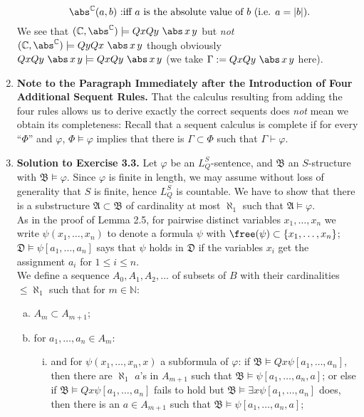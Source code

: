 \begin{enumerate}[1.]
\[
\mbox{ $\abs^\mathbb{C} (a, b)$ :iff $a$ is the absolute value of $b$ (i.e. $a = |b|$)}.
\]
We see that $(\mathbb{C}, \abs^\mathbb{C}) \models QxQy \ \abs \, x \, y$ but \emph{not} $(\mathbb{C}, \abs^\mathbb{C}) \models QyQx \ \abs \, x \, y$ though obviously $QxQy \ \abs \, x \, y \models QxQy \ \abs \, x \, y$ (we take $\Gamma := QxQy \ \abs \, x \, y$ here).
%
\item \textbf{Note to the Paragraph Immediately after the Introduction of Four Additional Sequent Rules.} That the calculus resulting from adding the four rules allows us to derive exactly the correct sequents does \emph{not} mean we obtain its completeness: Recall that a sequent calculus is complete if for every ``$\Phi$'' and $\varphi$, $\Phi \models \varphi$ implies that there is $\Gamma \subset \Phi$ such that $\Gamma \vdash \varphi$.
%
\item \textbf{Solution to Exercise 3.3.} Let $\varphi$ be an $L^S_Q$-sentence, and $\mathfrak{B}$ an $S$-structure with $\mathfrak{B} \models \varphi$. Since $\varphi$ is finite in length, we may assume without loss of generality that $S$ is finite, hence $L^S_Q$ is countable. We have to show that there is a substructure $\mathfrak{A} \subset \mathfrak{B}$ of cardinality at most $\aleph_1$ such that $\mathfrak{A} \models \varphi$.\newline
\ 
\\As in the proof of Lemma 2.5, for pairwise distinct variables $x_1, \ldots, x_n$ we write $\psi(x_1, \ldots, x_n)$ to denote a formula $\psi$ with $\free(\psi) \subset \{ x_1, \ldots, x_n \}$; $\mathfrak{D} \models \psi[a_1, \ldots, a_n]$ says that $\psi$ holds in $\mathfrak{D}$ if the variables $x_i$ get the assignment $a_i$ for $1 \leq i \leq n$.\newline
\ 
\\We define a sequence $A_0, A_1, A_2,\ldots$ of subsets of $B$ with their cardinalities $\leq \aleph_1$ such that for $m \in \mathbb{N}$:
\begin{enumerate}[(a)]
\item $A_m \subset A_{m + 1}$;
\item for $a_1, \ldots, a_n \in A_m$:
\begin{enumerate}[i)]
\item and for $\psi(x_1, \ldots, x_n, x)$ a subformula of $\varphi$: if $\mathfrak{B} \models Qx \psi[a_1, \ldots, a_n]$, then there are $\aleph_1$ $a$'s in $A_{m + 1}$ such that $\mathfrak{B} \models \psi[a_1, \ldots, a_n, a]$; or else if $\mathfrak{B} \models Qx \psi[a_1, \ldots, a_n]$ fails to hold but $\mathfrak{B} \models \exists x \psi[a_1, \ldots, a_n]$ does, then there is an $a \in A_{m + 1}$ such that $\mathfrak{B} \models \psi[a_1, \ldots, a_n, a]$;

\end{enumerate}
\end{enumerate}
\end{enumerate}
